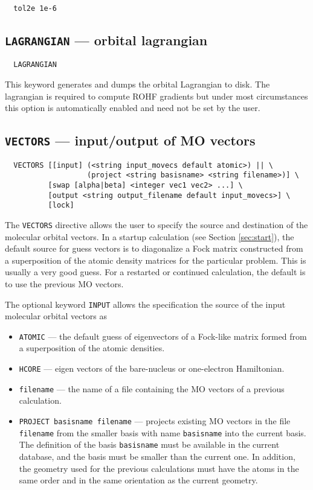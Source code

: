 \begin{verbatim}
  tol2e 1e-6
\end{verbatim}

\subsection{{\tt LAGRANGIAN} --- orbital lagrangian}

\begin{verbatim}
  LAGRANGIAN
\end{verbatim}

This keyword generates and dumps the orbital Lagrangian to disk. The
lagrangian is required to compute ROHF gradients but under most
circumstances this option is automatically enabled and need not be set
by the user.

\subsection{{\tt VECTORS} --- input/output of MO vectors}
\label{sec:vectors}


\begin{verbatim}
  VECTORS [[input] (<string input_movecs default atomic>) || \
                   (project <string basisname> <string filename>)] \
          [swap [alpha|beta] <integer vec1 vec2> ...] \
          [output <string output_filename default input_movecs>] \
          [lock]
\end{verbatim}

The \verb+VECTORS+ directive allows the user to specify the source and
destination of the molecular orbital vectors.  In a startup
calculation (see Section \ref{sec:start}), the default source for
guess vectors is to diagonalize a Fock matrix constructed from a
superposition of the atomic density matrices for the particular
problem.  This is usually a very good guess.  For a restarted or
continued calculation, the default is to use the previous MO vectors.

The optional keyword \verb+INPUT+ allows the specification the source
of the input molecular orbital vectors as
\begin{itemize}
\item \verb+ATOMIC+ --- the default guess of eigenvectors of a Fock-like
  matrix formed from a superposition of the atomic densities.
\item \verb+HCORE+ --- eigen vectors of the bare-nucleus or
  one-electron Hamiltonian.
\item \verb+filename+ --- the name of a file containing the MO
  vectors of a previous calculation.
\item \verb+PROJECT basisname filename+ --- projects existing MO
  vectors in the file \verb+filename+ from the smaller basis with name
  \verb+basisname+ into the current basis.  The definition of the
  basis \verb+basisname+ must be available in the current database,
  and the basis must be smaller than the current one.  In addition,
  the geometry used for the previous calculations must have the atoms
  in the same order and in the same orientation as the current
  geometry.
\end{itemize}
 
